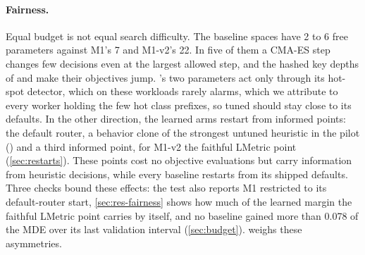 \paragraph{Fairness.}
Equal budget is not equal search difficulty. The baseline spaces have 2 to 6 free parameters
against M1's 7 and M1-v2's 22. In five of them a CMA-ES step changes few decisions even at the
largest allowed step, and the hashed key depths of  and  make their
objectives jump. 's two parameters act only through its hot-spot detector, which on
these workloads rarely alarms, which we attribute to every worker holding the few hot class
prefixes, so tuned  should stay close to its defaults. In the other direction,
the learned arms restart from informed points: the default router, a behavior clone of the
strongest untuned heuristic in the pilot () and a third informed point,
for M1-v2 the faithful LMetric point (\cref{sec:restarts}). These points cost no objective
evaluations but carry information from heuristic decisions, while every baseline restarts from its
shipped defaults. Three checks bound these effects: the test also reports M1 restricted to its
default-router start,
\cref{sec:res-fairness} shows how much of the learned margin the faithful LMetric point carries by
itself, and no baseline gained more than 0.078 of the MDE over its last validation interval
(\cref{sec:budget}).
 weighs these asymmetries.
